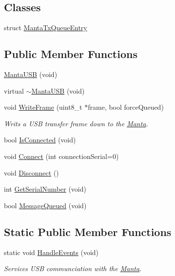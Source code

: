 \subsection*{\-Classes}
\begin{DoxyCompactItemize}
\item 
struct \hyperlink{structMantaUSB_1_1MantaTxQueueEntry}{\-Manta\-Tx\-Queue\-Entry}
\end{DoxyCompactItemize}
\subsection*{\-Public \-Member \-Functions}
\begin{DoxyCompactItemize}
\item 
\hyperlink{classMantaUSB_a3a7fbf215f3c81e434985783f32f3afc}{\-Manta\-U\-S\-B} (void)
\item 
virtual \hyperlink{classMantaUSB_a9d1ab2b1586314afc1473e99a78c0d06}{$\sim$\-Manta\-U\-S\-B} (void)
\item 
void \hyperlink{classMantaUSB_a38a9bc76333bab47574c63e1fe610002}{\-Write\-Frame} (uint8\-\_\-t $\ast$frame, bool force\-Queued)
\begin{DoxyCompactList}\small\item\em \-Writs a \-U\-S\-B transfer frame down to the \hyperlink{classManta}{\-Manta}. \end{DoxyCompactList}\item 
bool \hyperlink{classMantaUSB_a8464350b672b1c10f537bb2e3147e1c3}{\-Is\-Connected} (void)
\item 
void \hyperlink{classMantaUSB_a51e68daa5edfbc7ced89b6f9faa86ed5}{\-Connect} (int connection\-Serial=0)
\item 
void \hyperlink{classMantaUSB_abf5cac050689cc24982510e8f5adb71c}{\-Disconnect} ()
\item 
int \hyperlink{classMantaUSB_a5be6f8f54e60727c5c9b624125194d45}{\-Get\-Serial\-Number} (void)
\item 
bool \hyperlink{classMantaUSB_a3806f690096fa9a8885cd2d4733a898d}{\-Message\-Queued} (void)
\end{DoxyCompactItemize}
\subsection*{\-Static \-Public \-Member \-Functions}
\begin{DoxyCompactItemize}
\item 
static void \hyperlink{classMantaUSB_a4d55c1c1d9e769ce7a0ef532a72221e8}{\-Handle\-Events} (void)
\begin{DoxyCompactList}\small\item\em \-Services \-U\-S\-B communciation with the \hyperlink{classManta}{\-Manta}. \end{DoxyCompactList}\end{DoxyCompactItemize}
